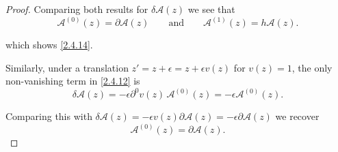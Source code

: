 \begin{tcolorbox}[breakable]
\begin{proof}
		Comparing both results for $\delta \mathscr{A}(z)$ we see that
		\begin{equation}
			\mathscr{A}^{(0)}(z) = \partial \mathscr{A}(z)
			\qquad \text{and} \qquad
			\mathscr{A}^{(1)}(z) = h\mathscr{A}(z) .
		\end{equation}
		
		which shows \eqref{2.4.14}.
		
		Similarly, under a translation $z'=z+\epsilon=z+\epsilon v(z)$ for $v(z)=1$, the only non-vanishing term in \eqref{2.4.12} is
		\begin{equation}
			\delta \mathscr{A}(z) = -\epsilon \partial^0 v(z)\, \mathscr{A}^{(0)}(z) = -\epsilon \mathscr{A}^{(0)}(z) .
		\end{equation}
		
		Comparing this with $\delta \mathscr{A}(z)=-\epsilon v(z)\partial \mathscr{A}(z)=-\epsilon \partial \mathscr{A}(z)$ we recover
		\begin{equation}
			\mathscr{A}^{(0)}(z) = \partial \mathscr{A}(z) .
		\end{equation}
	\end{proof}
\end{tcolorbox}

